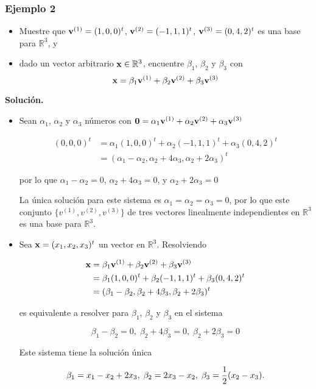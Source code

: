 \documentclass{report}
\numberwithin{subsection}{section} %
\begin{document}
\subsubsection*{Ejemplo 2}

\begin{itemize}
    \item Muestre que ${\bf v}^{(1)} = (1,0,0)^t$, ${\bf v}^{(2)} = (-1,1,1)^t$, ${\bf v}^{(3)} = (0,4,2)^t$ es una base para $\mathbb{R}^3$, y
    \item dado un vector arbitrario ${\bf x} \in \mathbb{R}^3$, encuentre $\beta_1$, $\beta_2$ y $\beta_3$ con
    $${\bf x} = \beta_1{\bf v}^{(1)} + \beta_2{\bf v}^{(2)} + \beta_3{\bf v}^{(3)}$$
\end{itemize}

{\bf Solución.}

\begin{itemize}

    \item Sean $\alpha_1$, $\alpha_2$ y $\alpha_3$ números con ${\bf 0} = \alpha_1{\bf v}^{(1)} + \alpha_2{\bf v}^{(2)} + \alpha_3{\bf v}^{(3)}$
    
    \begin{align*}
        (0,0,0)^t & = \alpha_1(1,0,0)^t + \alpha_2(-1,1,1)^t + \alpha_3(0,4,2)^t \\
        & = (\alpha_1 - \alpha_2, \alpha_2 + 4\alpha_3, \alpha_2 + 2\alpha_3)^t
    \end{align*}

    por lo que $\alpha_1 - \alpha_2 = 0$, $\alpha_2 + 4\alpha_3 = 0$, y $\alpha_2 + 2\alpha_3 = 0$

    La única solución para este sistema es $\alpha_1 = \alpha_2 = \alpha_3 = 0$, por lo que este conjunto $\{v^{(1)}, v^{(2)}, v^{(3)}\}$ de tres vectores linealmente independientes en $\mathbb{R}^3$ es una base para $\mathbb{R}^3$.

    \item Sea ${\bf x} = (x_1, x_2, x_3)^t$ un vector en $\mathbb{R}^3$. Resolviendo
    
    \begin{align*}
        {\bf x} & = \beta_1{\bf v}^{(1)} + \beta_2{\bf v}^{(2)} + \beta_3{\bf v}^{(3)} \\
                & = \beta_1(1,0,0)^t + \beta_2(-1,1,1)^t + \beta_3(0,4,2)^t \\
                & = (\beta_1 - \beta_2, \beta_2 + 4\beta_3, \beta_2 + 2\beta_3)^t
    \end{align*}

    es equivalente a resolver para $\beta_1$, $\beta_2$ y $\beta_3$ en el sistema

    $$\beta_1 - \beta_2 = 0, \; \beta_2 + 4\beta_3 = 0, \; \beta_2 + 2\beta_3 = 0$$

    Este sistema tiene la solución única

    $$\beta_1 = x_1 - x_2 + 2x_3, \; \beta_2 = 2x_3 - x_2, \; \beta_3 = {1 \over 2}(x_2 - x_3).$$
    
\end{itemize}
\end{document}
